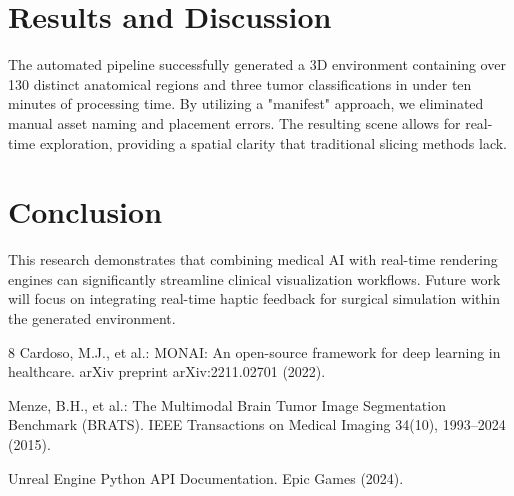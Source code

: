 \documentclass[runningheads]{llncs}
\begin{document}
\section{Results and Discussion}
The automated pipeline successfully generated a 3D environment containing over 130 distinct anatomical regions and three tumor classifications in under ten minutes of processing time. By utilizing a "manifest" approach, we eliminated manual asset naming and placement errors. The resulting scene allows for real-time exploration, providing a spatial clarity that traditional slicing methods lack.

\section{Conclusion}
This research demonstrates that combining medical AI with real-time rendering engines can significantly streamline clinical visualization workflows. Future work will focus on integrating real-time haptic feedback for surgical simulation within the generated environment.

%
%
\begin{thebibliography}{8}
Cardoso, M.J., et al.: MONAI: An open-source framework for deep learning in healthcare. arXiv preprint arXiv:2211.02701 (2022).

Menze, B.H., et al.: The Multimodal Brain Tumor Image Segmentation Benchmark (BRATS). IEEE Transactions on Medical Imaging 34(10), 1993--2024 (2015).

Unreal Engine Python API Documentation. Epic Games (2024).

\end{thebibliography}
\end{document}
